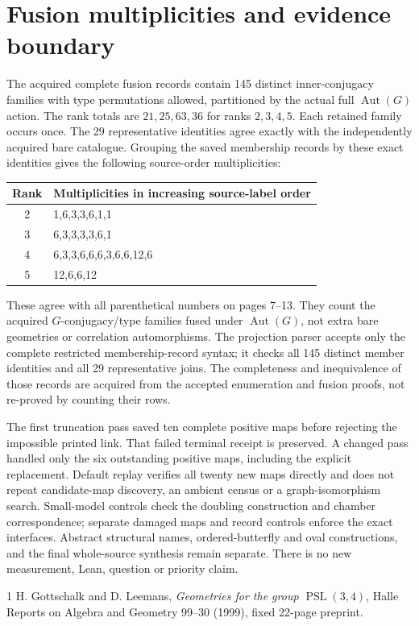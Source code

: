 \documentclass[11pt]{article}
\begin{document}
\section{Fusion multiplicities and evidence boundary}
The acquired complete fusion records contain 145 distinct inner-conjugacy
families with type permutations allowed, partitioned by the actual full
$\operatorname{Aut}(G)$ action. The rank totals are $21,25,63,36$ for
ranks $2,3,4,5$. Each retained family occurs once. The 29 representative
identities agree exactly with the independently acquired bare catalogue.
Grouping the saved membership records by these exact identities gives
the following source-order multiplicities:
\begin{center}\small
\begin{tabular}{cl}\toprule
Rank&Multiplicities in increasing source-label order\\\midrule
2&1,6,3,3,6,1,1\\
3&6,3,3,3,3,6,1\\
4&6,3,3,6,6,6,3,6,6,12,6\\
5&12,6,6,12\\\bottomrule
\end{tabular}
\end{center}
These agree with all parenthetical numbers on pages 7--13. They count
the acquired $G$-conjugacy/type families fused under
$\operatorname{Aut}(G)$, not extra bare geometries or correlation
automorphisms. The projection parser accepts only the complete
restricted membership-record syntax; it checks all 145 distinct
member identities and all 29 representative joins. The completeness
and inequivalence of those records are acquired from the accepted
enumeration and fusion proofs, not re-proved by counting their rows.

The first truncation pass saved ten complete positive maps before
rejecting the impossible printed link. That failed terminal receipt
is preserved. A changed pass handled only the six outstanding positive
maps, including the explicit replacement. Default replay verifies all
twenty new maps directly and does not repeat candidate-map discovery,
an ambient census or a graph-isomorphism search. Small-model controls
check the doubling construction and chamber correspondence; separate
damaged maps and record controls enforce the exact interfaces.
Abstract structural names, ordered-butterfly and oval constructions,
and the final whole-source synthesis remain separate. There is no new
measurement, Lean, question or priority claim.

\begin{thebibliography}{1}
 H. Gottschalk and D. Leemans,
\emph{Geometries for the group $\operatorname{PSL}(3,4)$},
Halle Reports on Algebra and Geometry 99--30 (1999), fixed 22-page preprint.
\end{thebibliography}
\end{document}
